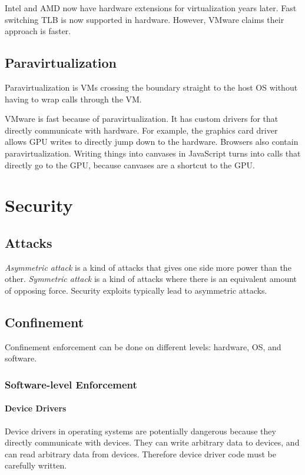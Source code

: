 \documentclass[twoside]{article}
\begin{document}
Intel and AMD now have hardware extensions for virtualization years later. Fast switching TLB is now supported in hardware. However, VMware claims their approach is faster.

\subsection{Paravirtualization}

Paravirtualization is VMs crossing the boundary straight to the host OS without having to wrap calls through the VM.

VMware is fast because of paravirtualization. It has custom drivers for that directly communicate with hardware. For example, the graphics card driver allows GPU writes to directly jump down to the hardware. Browsers also contain paravirtualization. Writing things into canvases in JavaScript turns into calls that directly go to the GPU, because canvases are a shortcut to the GPU.

\section{Security}

\subsection{Attacks}

\textit{Asymmetric attack} is a kind of attacks that gives one side more power than the other. \textit{Symmetric attack} is a kind of attacks where there is an equivalent amount of opposing force. Security exploits typically lead to asymmetric attacks.

\subsection{Confinement}

Confinement enforcement can be done on different levels: hardware, OS, and software.

\subsubsection{Software-level Enforcement}

\paragraph{Device Drivers}

Device drivers in operating systems are potentially dangerous because they directly communicate with devices. They can write arbitrary data to devices, and can read arbitrary data from devices. Therefore device driver code must be carefully written.
\end{document}
